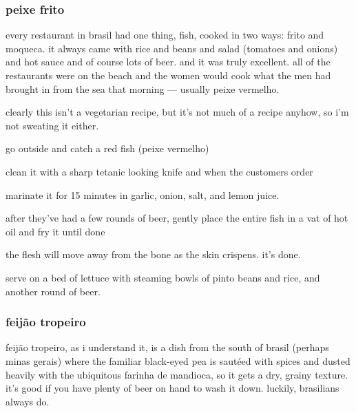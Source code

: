 \subsubsection{peixe frito}

every restaurant in brasil had one thing, fish, cooked in two ways:
frito and moqueca. it always came with rice and beans and salad
(tomatoes and onions) and hot sauce and of course lots of beer. and it
was truly excellent. all of the restaurants were on the beach and the
women would cook what the men had brought in from the sea that morning
--- usually peixe vermelho.

clearly this isn't a vegetarian recipe, but it's not much of a recipe
anyhow, so i'm not sweating it either.

\begin{algorithm}
  \item go outside and catch a red fish (\gls{peixe vermelho})

  \item clean it with a sharp tetanic looking knife and when the
  customers order

  \item marinate it for 15 minutes in garlic, onion, salt, and lemon
  juice.

  \item after they've had a few rounds of beer, gently place the
  entire fish in a vat of hot oil and fry it until done

  \item the flesh will move away from the bone as the skin
  crispens. it's done.

  \item serve on a bed of lettuce with steaming bowls of pinto beans
  and rice, and another round of beer.
\end{algorithm}

\subsubsection{feij\~{a}o tropeiro}

feij\~{a}o tropeiro, as i understand it, is a dish from the south of
brasil (perhaps minas gerais) where the familiar black-eyed pea is
saut\'{e}ed with spices and dusted heavily with the ubiquitous farinha
de mandioca, so it gets a dry, grainy texture. it's good if you have
plenty of beer on hand to wash it down. luckily, brasilians always do.

